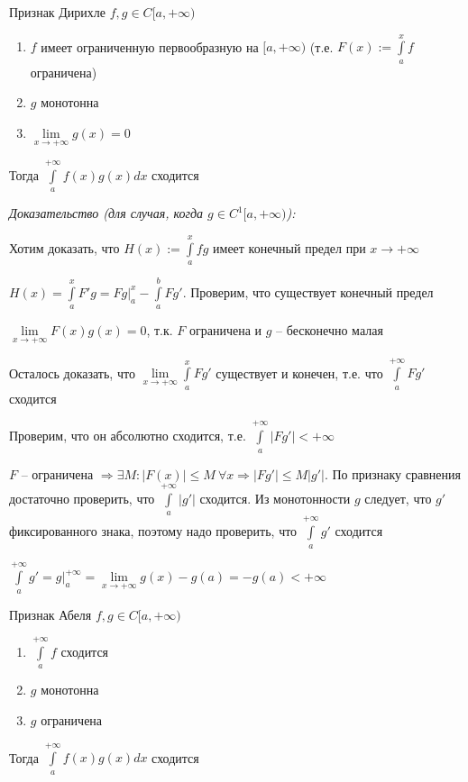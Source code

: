 \documentclass[12pt]{article}
\begin{document}
\begin{theo}{Признак Дирихле}
    $f, g \in C[a, + \infty)$

    \begin{enumerate}
        \item $f$ имеет ограниченную первообразную на $[a, + \infty)$ (т.е. $F(x) := \int\limits_a^x f$ ограничена)
        \item $g$ монотонна 
        \item $\lim\limits_{x \to + \infty} g(x) = 0$
    \end{enumerate}

    Тогда $\int\limits_a^{+ \infty} f(x)g(x)dx$ сходится
\end{theo}

\textit{Доказательство (для случая, когда $g \in C^1[a, + \infty)$):}

Хотим доказать, что $H(x) := \int\limits_a^x fg$ имеет конечный предел при $x \to + \infty$

$H(x) = \int\limits_a^x F'g = Fg|_a^x - \int\limits_a^b Fg'$. Проверим, что существует конечный предел

$\lim\limits_{x \to + \infty} F(x)g(x) = 0$, т.к. $F$ ограничена и $g$ -- бесконечно малая

Осталось доказать, что $\lim\limits_{x \to + \infty} \int\limits_a^x Fg'$ существует и конечен, т.е. что $\int\limits_a^{+ \infty} Fg'$ сходится

Проверим, что он абсолютно сходится, т.е. $\int\limits_a^{+ \infty} |Fg'| < + \infty$

$F$ -- ограничена $\Rightarrow \exists M : |F(x)| \leq M\ \forall x \Rightarrow |Fg'| \leq M|g'|$. По признаку сравнения достаточно проверить, что $\int\limits_a^{+ \infty} |g'|$ сходится. Из монотонности $g$ следует, что $g'$ фиксированного знака, поэтому надо проверить, что $\int\limits_a^{+ \infty} g'$ сходится

$\int\limits_a^{+ \infty} g' = g|_a^{+ \infty} = \lim\limits_{x \to + \infty} g(x) - g(a) = -g(a) < + \infty$

\begin{theo}{Признак Абеля}
    $f, g \in C[a, + \infty)$

    \begin{enumerate}
        \item $\int\limits_a^{+ \infty} f$ сходится
        \item $g$ монотонна 
        \item $g$ ограничена
    \end{enumerate}

    Тогда $\int\limits_a^{+ \infty} f(x)g(x)dx$ сходится
\end{theo}
\end{document}
